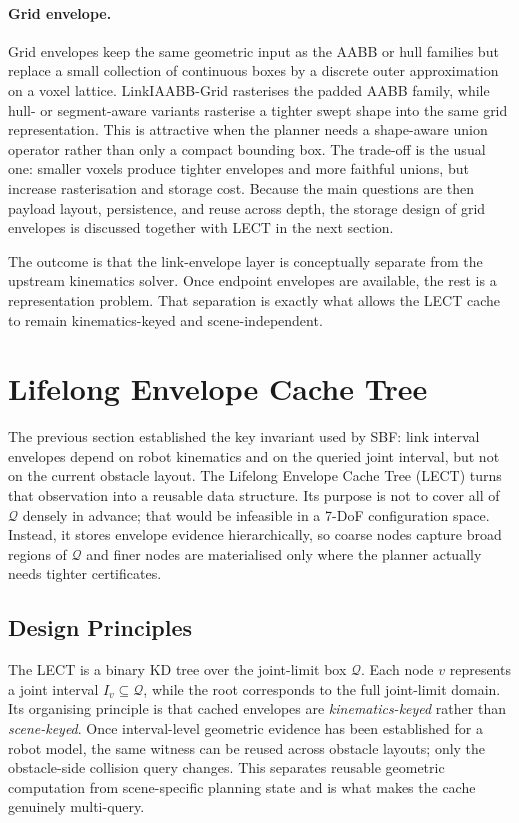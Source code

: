 \documentclass[journal]{IEEEtran}
\newcommand{\sbf}{\textsc{SBF}}
\newcommand{\Q}{\ensuremath{\mathcal{Q}}}
\begin{document}
\paragraph{Grid envelope.}
Grid envelopes keep the same geometric input as the AABB or hull families but
replace a small collection of continuous boxes by a discrete outer
approximation on a voxel lattice. LinkIAABB-Grid rasterises the padded AABB
family, while hull- or segment-aware variants rasterise a tighter swept shape
into the same grid representation. This is attractive when the planner needs a
shape-aware union operator rather than only a compact bounding box. The
trade-off is the usual one: smaller voxels produce tighter envelopes and more
faithful unions, but increase rasterisation and storage cost. Because the main
questions are then payload layout, persistence, and reuse across depth, the
storage design of grid envelopes is discussed together with LECT in the next
section.

The outcome is that the link-envelope layer is conceptually separate from the
upstream kinematics solver. Once endpoint envelopes are available, the rest is a
representation problem. That separation is exactly what allows the LECT cache to
remain kinematics-keyed and scene-independent.

\section{Lifelong Envelope Cache Tree}\label{sec:lect}

The previous section established the key invariant used by \sbf{}: link
interval envelopes depend on robot kinematics and on the queried joint interval,
but not on the current obstacle layout. The Lifelong Envelope Cache Tree
(LECT) turns that observation into a reusable data structure. Its purpose is
not to cover all of $\Q$ densely in advance; that would be infeasible in a
7-DoF configuration space. Instead, it stores envelope evidence hierarchically,
so coarse nodes capture broad regions of $\Q$ and finer nodes are materialised
only where the planner actually needs tighter certificates.

\subsection{Design Principles}\label{sec:lect_design}

The LECT is a binary KD tree over the joint-limit box $\Q$. Each node $v$
represents a joint interval $I_v \subseteq \Q$, while the root corresponds to
the full joint-limit domain. Its organising principle is that cached envelopes
are \emph{kinematics-keyed} rather than \emph{scene-keyed}. Once interval-level
geometric evidence has been established for a robot model, the same witness can
be reused across obstacle layouts; only the obstacle-side collision query
changes. This separates reusable geometric computation from scene-specific
planning state and is what makes the cache genuinely multi-query.
\end{document}
